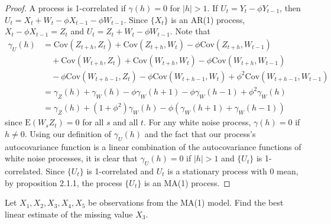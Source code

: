 \documentclass[12pt]{article}
\theoremstyle{definition}
\newenvironment{custompbm}[1]
  {\renewcommand\theproblem{#1}\problem}
  {\endproblem}
\newcommand{\E}{\text{E}}
\newcommand{\Co}[2]{\text{Cov}\left({#1}, {#2}\right)}
\begin{document}
\begin{proof}
  A process is 1-correlated if $\gamma(h) = 0$ for $|h| > 1$.
  If $U_t = Y_t - \phi Y_{t-1}$, then $U_t = X_t + W_t - \phi X_{t-1} - \phi W_{t-1}$.
  Since $\{X_t\}$ is an AR(1) process, $X_t - \phi X_{t-1} = Z_t$ and
  $U_t = Z_t + W_t - \phi W_{t-1}$. Note that
  \begin{align*}
    \gamma_U(h) &= \Co{Z_{t+h}}{Z_t} + \Co{Z_{t+h}}{W_{t}} -\phi \Co{Z_{t+h}}{W_{t-1}}\\
    &\quad + \Co{W_{t+h}}{Z_t} + \Co{W_{t+h}}{W_t} - \phi \Co{W_{t+h}}{W_{t-1}} \\
    &\quad -\phi \Co{W_{t+h-1}}{Z_t} -\phi\Co{W_{t+h-1}}{W_t} + \phi^2 \Co{W_{t+h-1}}{W_{t-1}}\\
    &= \gamma_Z(h) + \gamma_W(h) -\phi\gamma_W(h+1) -\phi\gamma_W(h-1) + \phi^2 \gamma_W(h)\\
    &= \gamma_Z(h) + (1 + \phi^2)\gamma_W(h) - \phi(\gamma_W(h+1) + \gamma_W(h-1))
  \end{align*}
  since $\E(W_sZ_t) = 0$ for all $s$ and all $t$. For any white noise process,
  $\gamma(h) = 0$ if $h \neq 0$. Using our definition of $\gamma_U(h)$ and the fact
  that our process's autocovariance function is a linear combination of the
  autocovariance functions of white noise processes, it is clear that $\gamma_U(h) = 0$ if $|h| > 1$
  and $\{U_t\}$ is 1-correlated. Since $\{U_t\}$ is 1-correlated and
  $U_t$ is a stationary process with 0 mean, by proposition 2.1.1, the process
  $\{U_t\}$ is an MA(1) process.
\end{proof}

\begin{custompbm}{4.a}
  Let $X_1, X_2, X_3, X_4, X_5$ be observations from the MA(1) model.
  Find the best linear estimate of the missing value $X_3$.
\end{custompbm}
\end{document}
